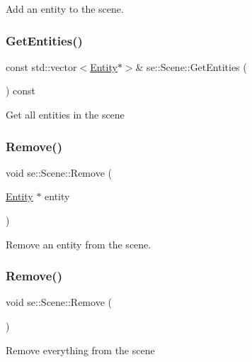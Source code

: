 Add an entity to the scene. \mbox{\label{classse_1_1_scene_a1c3f1fc4ab110f9caab190cce13c2e03}} 
\subsubsection{\texorpdfstring{Get\+Entities()}{GetEntities()}}
{\footnotesize\ttfamily const std\+::vector$<$\mbox{\hyperlink{classse_1_1_entity}{Entity}}$\ast$$>$\& se\+::\+Scene\+::\+Get\+Entities (\begin{DoxyParamCaption}{ }\end{DoxyParamCaption}) const}

Get all entities in the scene \mbox{\label{classse_1_1_scene_a4133b3e65c59229d8926dde7976ec004}} 
\subsubsection{\texorpdfstring{Remove()}{Remove()}\hspace{0.1cm}{\footnotesize\ttfamily [1/2]}}
{\footnotesize\ttfamily void se\+::\+Scene\+::\+Remove (\begin{DoxyParamCaption}\item[{\mbox{\hyperlink{classse_1_1_entity}{Entity}} $\ast$}]{entity }\end{DoxyParamCaption})}

Remove an entity from the scene. \mbox{\label{classse_1_1_scene_a73f7789f2585e65174380be509b88435}} 
\subsubsection{\texorpdfstring{Remove()}{Remove()}\hspace{0.1cm}{\footnotesize\ttfamily [2/2]}}
{\footnotesize\ttfamily void se\+::\+Scene\+::\+Remove (\begin{DoxyParamCaption}{ }\end{DoxyParamCaption})}

Remove everything from the scene \mbox{\label{classse_1_1_scene_acdc3858f5d4fd76cf9a712a02218341a}} 
